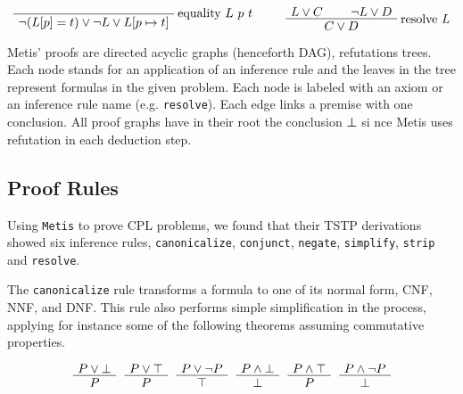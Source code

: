 \documentclass[runningheads,a4paper]{llncs}
\newenvironment{bprooftree}
  {\leavevmode\hbox\bgroup}
  {\DisplayProof\egroup}
\begin{document}
\[
\begin{bprooftree}
\AxiomC{}
\RightLabel{equality $L$ $p$ $t$}
\UnaryInfC{$\neg (L[p] = t) \vee \neg L \vee L[ p \mapsto t]$}
\end{bprooftree}
\qquad
\begin{bprooftree}
\AxiomC{$L \vee C$}
\AxiomC{$\neg L \vee D$}
\RightLabel{resolve $L$}
\BinaryInfC{$C \vee D$}
\end{bprooftree}
\]

Metis’ proofs are directed acyclic graphs (henceforth DAG), refutations trees. Each node stands for an application of an inference rule and the leaves in the tree represent formulas in the given problem. Each node is labeled with an axiom or an inference rule name (e.g. \verb!resolve!). Each edge links a premise with one conclusion. All proof graphs have in their root the conclusion ⊥ si
nce Metis uses refutation in each deduction step.


\subsection{Proof Rules}
Using \verb!Metis! to prove CPL problems, we found that their TSTP derivations showed six inference rules, \verb!canonicalize!, \verb!conjunct!, \verb!negate!, \verb!simplify!,  \verb!strip! and \verb!resolve!. 

The \verb!canonicalize! rule transforms a formula to one of its normal form, CNF, NNF, and DNF.
This rule also performs simple simplification in the process, applying for instance some of the following theorems assuming commutative properties.

\[
\begin{bprooftree}
  \AxiomC{$P \vee \bot$}
  \UnaryInfC{$P$}
\end{bprooftree}
\begin{bprooftree}
\AxiomC{$P \vee \top$}
\UnaryInfC{$P$}
\end{bprooftree}
\begin{bprooftree}
\AxiomC{$P \vee \neg P$}
\UnaryInfC{$\top$}
\end{bprooftree}
\begin{bprooftree}
  \AxiomC{$P \wedge \bot$}
  \UnaryInfC{$\bot$}
\end{bprooftree}
\begin{bprooftree}
  \AxiomC{$P \wedge \top$}
  \UnaryInfC{$P$}
\end{bprooftree}
\begin{bprooftree}
  \AxiomC{$P \wedge \neg P$}
  \UnaryInfC{$\bot$}
\end{bprooftree}
\]
\end{document}
